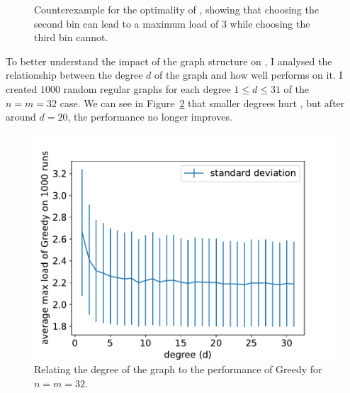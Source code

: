 \begin{figure}
    \centering
    \caption{Counterexample for the optimality of \Greedy, showing that choosing the second bin can lead to a maximum load of $3$ while choosing the third bin cannot.}
    \label{greedy-counterexample}
\end{figure}



To better understand the impact of the graph structure on \Greedy, I analysed the relationship between the degree $d$ of the graph and how well \Greedy performs on it. I created $1000$ random regular graphs for each degree $1\leq d \leq 31$ of the $n=m=32$ case.  We can see in Figure~\ref{greedy-random-regular-analysis} that smaller degrees hurt \Greedy, but after around $d=20$, the performance no longer improves.


\begin{figure}[h]
    \centering
    \includegraphics[scale=0.6]{Chapter4/Figs/greedy_degree_analysis_32_32.pdf}
    \caption{Relating the degree of the graph to the performance of Greedy for $n=m=32$.}
    \label{greedy-random-regular-analysis}
\end{figure}


